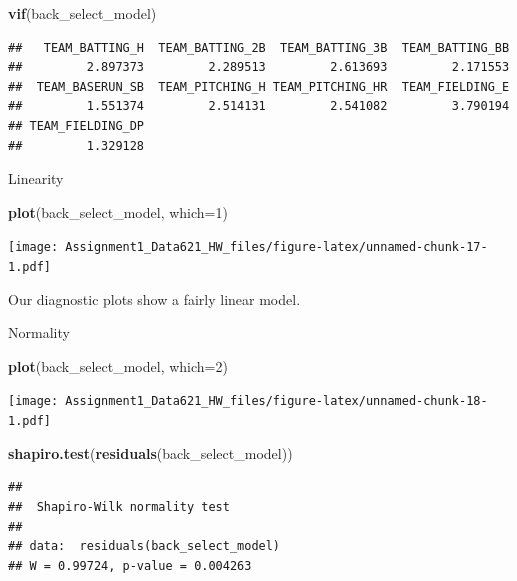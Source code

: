 \documentclass[
]{article}
\newenvironment{Shaded}{\begin{snugshade}}{\end{snugshade}}
\newcommand{\AttributeTok}[1]{\textcolor[rgb]{0.13,0.29,0.53}{#1}}
\newcommand{\DecValTok}[1]{\textcolor[rgb]{0.00,0.00,0.81}{#1}}
\newcommand{\FunctionTok}[1]{\textcolor[rgb]{0.13,0.29,0.53}{\textbf{#1}}}
\newcommand{\NormalTok}[1]{#1}
\begin{document}
\begin{Shaded}
\begin{Highlighting}[]
\FunctionTok{vif}\NormalTok{(back\_select\_model)}
\end{Highlighting}
\end{Shaded}

\begin{verbatim}
##   TEAM_BATTING_H  TEAM_BATTING_2B  TEAM_BATTING_3B  TEAM_BATTING_BB 
##         2.897373         2.289513         2.613693         2.171553 
##  TEAM_BASERUN_SB  TEAM_PITCHING_H TEAM_PITCHING_HR  TEAM_FIELDING_E 
##         1.551374         2.514131         2.541082         3.790194 
## TEAM_FIELDING_DP 
##         1.329128
\end{verbatim}

Linearity

\begin{Shaded}
\begin{Highlighting}[]
\FunctionTok{plot}\NormalTok{(back\_select\_model, }\AttributeTok{which=}\DecValTok{1}\NormalTok{)}
\end{Highlighting}
\end{Shaded}

\texttt{[image: Assignment1\_Data621\_HW\_files/figure-latex/unnamed-chunk-17-1.pdf]}

Our diagnostic plots show a fairly linear model.

Normality

\begin{Shaded}
\begin{Highlighting}[]
\FunctionTok{plot}\NormalTok{(back\_select\_model, }\AttributeTok{which=}\DecValTok{2}\NormalTok{)}
\end{Highlighting}
\end{Shaded}

\texttt{[image: Assignment1\_Data621\_HW\_files/figure-latex/unnamed-chunk-18-1.pdf]}

\begin{Shaded}
\begin{Highlighting}[]
\FunctionTok{shapiro.test}\NormalTok{(}\FunctionTok{residuals}\NormalTok{(back\_select\_model))}
\end{Highlighting}
\end{Shaded}

\begin{verbatim}
## 
##  Shapiro-Wilk normality test
## 
## data:  residuals(back_select_model)
## W = 0.99724, p-value = 0.004263
\end{verbatim}
\end{document}
